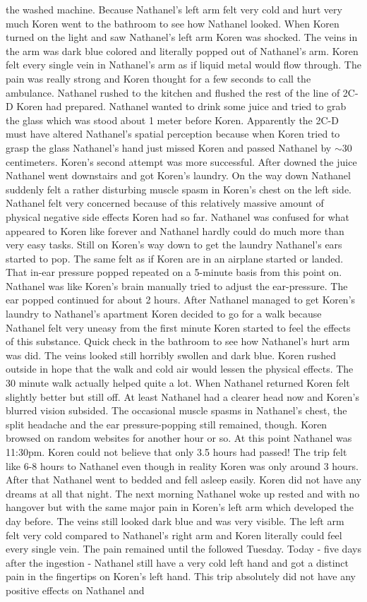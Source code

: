 \documentclass[12pt]{book}
\begin{document}
the washed machine. Because Nathanel's left arm felt very cold and hurt very much Koren went to the bathroom to see how Nathanel looked. When Koren turned on the light and saw Nathanel's left arm Koren was shocked. The veins in the arm was dark blue colored and literally popped out of Nathanel's arm. Koren felt every single vein in Nathanel's arm as if liquid metal would flow through. The pain was really strong and Koren thought for a few seconds to call the ambulance. Nathanel rushed to the kitchen and flushed the rest of the line of 2C-D Koren had prepared. Nathanel wanted to drink some juice and tried to grab the glass which was stood about 1 meter before Koren. Apparently the 2C-D must have altered Nathanel's spatial perception because when Koren tried to grasp the glass Nathanel's hand just missed Koren and passed Nathanel by $\sim$30 centimeters. Koren's second attempt was more successful. After downed the juice Nathanel went downstairs and got Koren's laundry. On the way down Nathanel suddenly felt a rather disturbing muscle spasm in Koren's chest on the left side. Nathanel felt very concerned because of this relatively massive amount of physical negative side effects Koren had so far. Nathanel was confused for what appeared to Koren like forever and Nathanel hardly could do much more than very easy tasks. Still on Koren's way down to get the laundry Nathanel's ears started to pop. The same felt as if Koren are in an airplane started or landed. That in-ear pressure popped repeated on a 5-minute basis from this point on. Nathanel was like Koren's brain manually tried to adjust the ear-pressure. The ear popped continued for about 2 hours. After Nathanel managed to get Koren's laundry to Nathanel's apartment Koren decided to go for a walk because Nathanel felt very uneasy from the first minute Koren started to feel the effects of this substance. Quick check in the bathroom to see how Nathanel's hurt arm was did. The veins looked still horribly swollen and dark blue. Koren rushed outside in hope that the walk and cold air would lessen the physical effects. The 30 minute walk actually helped quite a lot. When Nathanel returned Koren felt slightly better but still off. At least Nathanel had a clearer head now and Koren's blurred vision subsided. The occasional muscle spasms in Nathanel's chest, the split headache and the ear pressure-popping still remained, though. Koren browsed on random websites for another hour or so. At this point Nathanel was 11:30pm. Koren could not believe that only 3.5 hours had passed! The trip felt like 6-8 hours to Nathanel even though in reality Koren was only around 3 hours. After that Nathanel went to bedded and fell asleep easily. Koren did not have any dreams at all that night. The next morning Nathanel woke up rested and with no hangover but with the same major pain in Koren's left arm which developed the day before. The veins still looked dark blue and was very visible. The left arm felt very cold compared to Nathanel's right arm and Koren literally could feel every single vein. The pain remained until the followed Tuesday. Today - five days after the ingestion - Nathanel still have a very cold left hand and got a distinct pain in the fingertips on Koren's left hand. This trip absolutely did not have any positive effects on Nathanel and 
\end{document}
